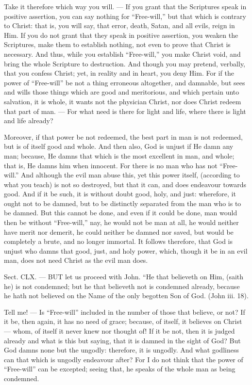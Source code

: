 Take it therefore which way you will. — If you grant that the Scriptures speak in positive assertion, you can say nothing for “Free-will,” but that which is contrary to Christ: that is, you will say, that error, death, Satan, and all evils, reign in Him. If you do not grant that they speak in positive assertion, you weaken the Scriptures, make them to establish nothing, not even to prove that Christ is necessary. And thus, while you establish “Free-will,” you make Christ void, and bring the whole Scripture to destruction. And though you may pretend, verbally, that you confess Christ; yet, in reality and in heart, you deny Him. For if the power of “Free-will” be not a thing erroneous altogether, and damnable, but sees and wills those things which are good and meritorious, and which pertain unto salvation, it is whole, it wants not the physician Christ, nor does Christ redeem that part of man. — For what need is there for light and life, where there is light and life already?

Moreover, if that power be not redeemed, the best part in man is not redeemed, but is of itself good and whole. And then also, God is unjust if He damn any man; because, He damns that which is the most excellent in man, and whole; that is, He damns him when innocent. For there is no man who has not “Free-will.” And although the evil man abuse this, yet this power itself, (according to what you teach) is not so destroyed, but that it can, and does endeavour towards good. And if it be such, it is without doubt good, holy, and just: wherefore, it ought not to be damned, but to be distinctly separated from the man who is to be damned. But this cannot be done, and even if it could be done, man would then be without “Free-will,” nay, he would not be man at all, he would neither have merit nor demerit, he could neither be damned nor saved, but would be completely a brute, and no longer immortal. It follows therefore, that God is unjust who damns that good, just, and holy power, which, though it be in an evil man, does not need Christ as the evil man does.


Sect. CLX. — BUT let us proceed with John. “He that believeth on Him, (saith he) is not condemned; but he that believeth not is condemned already, because he hath not believed on the Name of the only begotten Son of God. (John iii. 18).

Tell me! — Is “Free-will” included in the number of those that believe, or not? If it be, then again, it has no need of grace; because, of itself, it believes on Christ — whom, of itself it never knew nor thought of! If it be not, then it is judged already and what is this but saying, that it is damned in the sight of God? But God damns none but the ungodly: therefore, it is ungodly. And what godliness can that which is ungodly endeavour after? For I do not think that the power of “Free-will” can be excepted; seeing that, he speaks of the whole man as being condemned.

